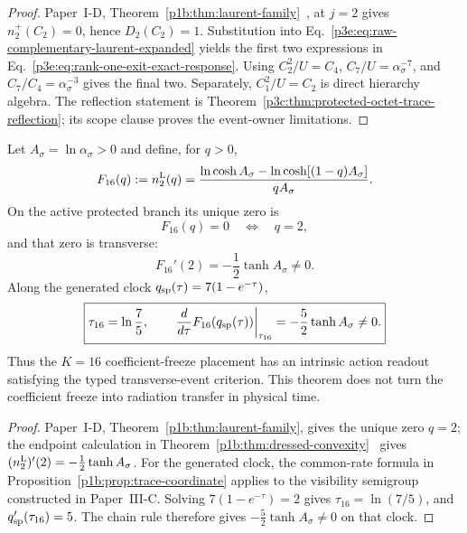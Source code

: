 \documentclass[11pt,a4paper]{article}
\begin{document}
\begin{proof}
Paper~I-D, Theorem~\ref{p1b:thm:laurent-family}~\cite{Kugelmann2026Paper1D},
at \(j=2\) gives \(n_2^+(C_2)=0\), hence \(D_2(C_2)=1\).  Substitution into
Eq.~\eqref{p3e:eq:raw-complementary-laurent-expanded} yields the first two
expressions in Eq.~\eqref{p3e:eq:rank-one-exit-exact-response}.  Using
\(C_2^2/U=C_4\), \(C_7/U=\alpha_\sigma^{-7}\), and
\(C_7/C_4=\alpha_\sigma^{-3}\) gives the final two.  Separately,
\(C_1^2/U=C_2\) is direct hierarchy algebra.  The reflection statement
is Theorem~\ref{p3c:thm:protected-octet-trace-reflection}; its scope clause
proves the event-owner limitations.
\end{proof}

\begin{theorem}
\label{p3e:thm:depth-two-transverse-event}
Let \(A_\sigma=\ln\alpha_\sigma>0\) and define, for \(q>0\),
\begin{equation}
\label{p3e:eq:depth-two-event-functional}
 F_{16}(q):=n_2^{\rm L}(q)
 =\frac{\ln\cosh A_\sigma
       -\ln\cosh[(1-q)A_\sigma]}{qA_\sigma}.
\end{equation}
On the active protected branch its unique zero is
\begin{equation}
\label{p3e:eq:depth-two-event-unique-zero}
 \boxed{F_{16}(q)=0\quad\Longleftrightarrow\quad q=2,}
\end{equation}
and that zero is transverse:
\begin{equation}
\label{p3e:eq:depth-two-event-q-derivative}
 \boxed{F_{16}'(2)=-\frac12\tanh A_\sigma\ne0.}
\end{equation}
Along the generated clock \(q_{\rm sp}(\tau)=7(1-e^{-\tau})\),
\begin{equation}
\label{p3e:eq:depth-two-event-clock-crossing}
 \boxed{\tau_{16}=\ln\frac75,\qquad
 \left.\frac{d}{d\tau}F_{16}(q_{\rm sp}(\tau))\right|_{\tau_{16}}
 =-\frac52\tanh A_\sigma\ne0.}
\end{equation}
Thus the \(K=16\) coefficient-freeze placement has an intrinsic action
readout satisfying the typed transverse-event criterion.  This theorem does
not turn the coefficient freeze into radiation transfer in physical time.
\end{theorem}

\begin{proof}
Paper~I-D, Theorem~\ref{p1b:thm:laurent-family}, gives the unique zero
\(q=2\); the endpoint calculation in
Theorem~\ref{p1b:thm:dressed-convexity}~\cite{Kugelmann2026Paper1D}
gives \((n_2^{\rm L})'(2)=-\tfrac12\tanh A_\sigma\).
For the generated clock, the common-rate formula in
Proposition~\ref{p1b:prop:trace-coordinate} applies to the visibility
semigroup constructed in Paper~III-C.  Solving
\(7(1-e^{-\tau})=2\) gives \(\tau_{16}=\ln(7/5)\), and
\(q_{\rm sp}'(\tau_{16})=5\).  The chain rule therefore gives
\(-\tfrac52\tanh A_\sigma\ne0\) on that clock.
\end{proof}
\end{document}
